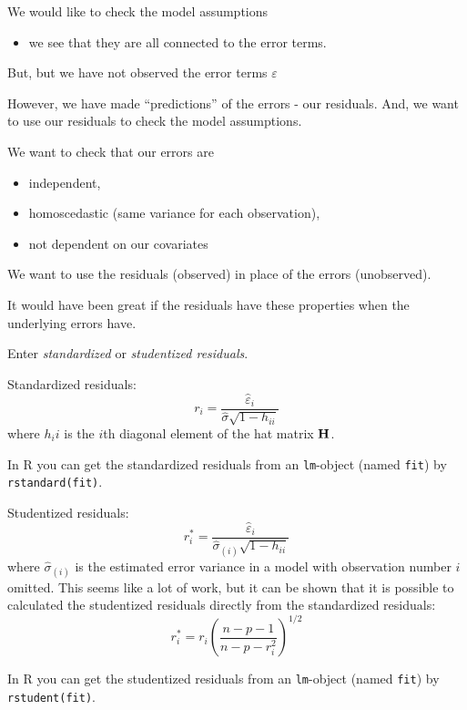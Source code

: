 \documentclass[
  ignorenonframetext,
]{beamer}
\providecommand{\tightlist}{%
  \setlength{\itemsep}{0pt}\setlength{\parskip}{0pt}}
\begin{document}
\begin{frame}
We would like to check the model assumptions

\begin{itemize}
\tightlist
\item
  we see that they are all connected to the error terms.
\end{itemize}

But, but we have not observed the error terms \(\varepsilon\)

However, we have made ``predictions'' of the errors - our residuals.
And, we want to use our residuals to check the model assumptions.
\end{frame}

\begin{frame}
We want to check that our errors are

\begin{itemize}
\tightlist
\item
  independent,
\item
  homoscedastic (same variance for each observation),
\item
  not dependent on our covariates
\end{itemize}

We want to use the residuals (observed) in place of the errors
(unobserved).

It would have been great if the residuals have these properties when the
underlying errors have.

Enter \emph{standardized} or \emph{studentized residuals}.
\end{frame}

\begin{frame}[fragile]
\begin{block}{Standardized residuals:}
\label{standardized-residuals}
\[r_i=\frac{\hat{\varepsilon}_i}{\hat{\sigma}\sqrt{1-h_{ii}}}\] where
\(h_ii\) is the \(i\)th diagonal element of the hat matrix \({\bf H}\).

In R you can get the standardized residuals from an \texttt{lm}-object
(named \texttt{fit}) by \texttt{rstandard(fit)}.
\end{block}
\end{frame}

\begin{frame}[fragile]
\begin{block}{Studentized residuals:}
\label{studentized-residuals}
\[r^*_i=\frac{\hat{\varepsilon}_i}{\hat{\sigma}_{(i)}\sqrt{1-h_{ii}}}\]
where \(\hat{\sigma}_{(i)}\) is the estimated error variance in a model
with observation number \(i\) omitted. This seems like a lot of work,
but it can be shown that it is possible to calculated the studentized
residuals directly from the standardized residuals:
\[r^*_i=r_i (\frac{n-p-1}{n-p-r_i^2})^{1/2}\]

In R you can get the studentized residuals from an \texttt{lm}-object
(named \texttt{fit}) by \texttt{rstudent(fit)}.
\end{block}
\end{frame}
\end{document}
